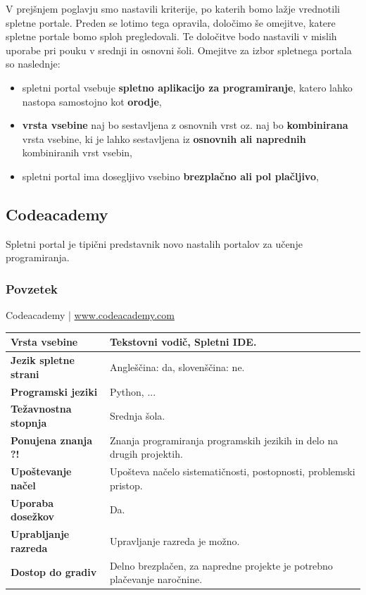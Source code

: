 V prejšnjem poglavju smo nastavili kriterije, po katerih bomo lažje
vrednotili spletne portale. Preden se lotimo tega opravila, določimo
še omejitve, katere spletne portale bomo sploh pregledovali. Te
določitve bodo nastavili v mislih uporabe pri pouku v srednji in
osnovni šoli. Omejitve za izbor spletnega portala so naslednje:

\begin{itemize}
  \tightlist
\item spletni portal vsebuje \textbf{spletno aplikacijo za
    programiranje}, katero lahko nastopa samostojno kot
  \textbf{orodje},
\item \textbf{vrsta vsebine} naj bo sestavljena z osnovnih vrst
  oz. naj bo \textbf{kombinirana} vrsta vsebine, ki je lahko
  sestavljena iz \textbf{osnovnih ali naprednih} kombiniranih vrst vsebin,
\item spletni portal ima dosegljivo vsebino \textbf{brezplačno ali pol
  plačljivo},
\end{itemize}

\subsection{Codeacademy}

Spletni portal je tipični predstavnik novo nastalih portalov za učenje
programiranja.

\subsubsection{Povzetek}

\begin{osebnabox}[label={osebna:codeacademy}]{Codeacademy | \url{www.codeacademy.com}}
    \begin{tabular}{
  p{} |
  p{}  }
  \textbf{Vrsta vsebine} & Tekstovni vodič, Spletni IDE. \\
      \hline
  \textbf{Jezik spletne strani} &  Angleščina: da, slovenščina: ne. \\
      \hline
  \textbf{Programski jeziki} & Python, ... \\
      \hline
  \textbf{Težavnostna stopnja} & Srednja šola. \\
      \hline
  \textbf{Ponujena znanja ?!} & Znanja programiranja programskih jezikih
      in delo na drugih projektih. \\
      \hline
  \textbf{Upoštevanje načel} & Upošteva načelo sistematičnosti,
      postopnosti, problemski pristop. \\
      \hline
  \textbf{Uporaba dosežkov} & Da. \\
      \hline
  \textbf{Uprabljanje razreda} & Upravljanje razreda je možno. \\
      \hline
  \textbf{Dostop do gradiv} & Delno brezplačen, za napredne projekte je
      potrebno plačevanje naročnine. \\
\end{tabular}
\end{osebnabox}

